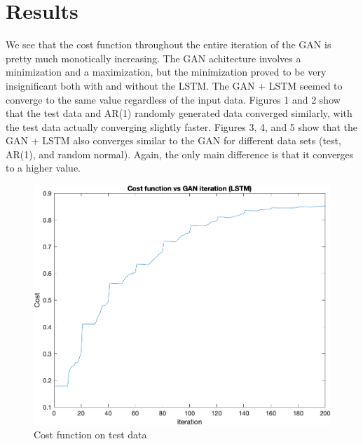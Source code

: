 \documentclass[10pt]{article}
\begin{document}
\section{Results}
We see that the cost function throughout the entire iteration of the GAN is pretty much monotically increasing. The GAN achitecture involves a minimization and a maximization, but the minimization proved to be very insignificant both with and without the LSTM. The GAN + LSTM seemed to converge to the same value regardless of the input data. Figures 1 and 2 show that the test data and AR(1) randomly generated data converged similarly, with the test data actually converging slightly faster. Figures 3, 4, and 5 show that the GAN + LSTM also converges similar to the GAN for different data sets (test, AR(1), and random normal). Again, the only main difference is that it converges to a higher value. 
\begin{figure}[h]
    \centering
    \includegraphics[angle=0,scale=.6]{testcost}
    \caption{Cost function on test data}
\end{figure}
\end{document}
